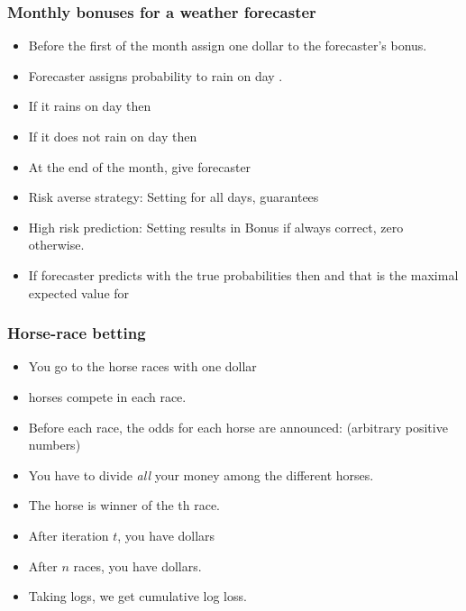 \documentclass[handout]{beamer}
\begin{document}
\begin{frame}
\frametitle{Monthly bonuses for a weather forecaster}
\begin{itemize}
\item Before the first of the month assign one dollar to the forecaster's bonus. 
\item Forecaster assigns probability  to rain on day .
\item If it rains on day  then 
\item If it does not rain on day  then 
\item At the end of the month, give forecaster 
\item Risk averse strategy: Setting  for all days, guarantees 
\item High risk prediction: Setting  results in Bonus  if always correct, zero otherwise.
\item If forecaster predicts with the true probabilities then 
 and that is the maximal expected value for 
\end{itemize}
\end{frame}

\begin{frame}
\frametitle{Horse-race betting}
\begin{itemize}
\item You go to the horse races with one dollar 
\item {} horses compete in each race.
\item Before each race, the odds for each horse are announced:
   (arbitrary positive numbers)
\item You have to divide {\em all} your money among the different
  horses. 
\item The horse   is winner of the th race.
\item After iteration $t$, you have
   dollars
\item After $n$ races, you have
   dollars.
\item Taking logs, we get cumulative log loss.
\end{itemize}
\end{frame}
\end{document}
